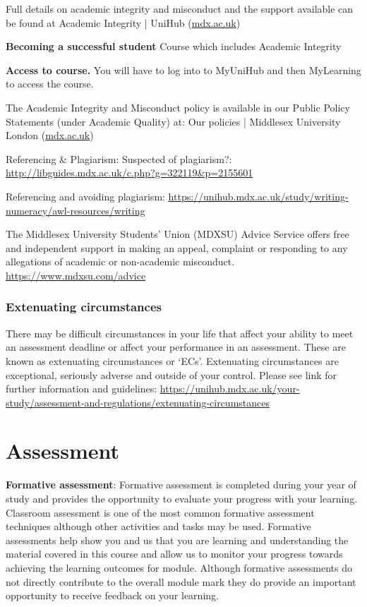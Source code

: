 \documentclass{MDXHandbook}
\begin{document}
Full details on academic integrity and misconduct and the support available can be found at  Academic Integrity | UniHub (\url{mdx.ac.uk}) 

\textbf{Becoming a successful student} Course which includes Academic Integrity

\textbf{Access to course.} You will have to log into to MyUniHub and then MyLearning to access the course.

The Academic Integrity and Misconduct policy is available in our Public Policy Statements (under Academic Quality) at: Our policies | Middlesex University London (\url{mdx.ac.uk})

Referencing \& Plagiarism: Suspected of plagiarism?:
\url{http://libguides.mdx.ac.uk/c.php?g=322119&p=2155601}

Referencing and avoiding plagiarism:
\url{https://unihub.mdx.ac.uk/study/writing-numeracy/awl-resources/writing}

The Middlesex University Students’ Union (MDXSU) Advice Service offers free and independent support  in making an appeal, complaint or responding to any allegations of academic or non-academic misconduct. 
\url{https://www.mdxsu.com/advice}

\subsubsection*{Extenuating circumstances}
There may be difficult circumstances in your life that affect your ability to meet an assessment deadline or affect your performance in an assessment. These are known as extenuating circumstances or ‘ECs’. Extenuating circumstances are exceptional, seriously adverse and outside of your control. Please see link for further information and guidelines:
\url{https://unihub.mdx.ac.uk/your-study/assessment-and-regulations/extenuating-circumstances}

\section{Assessment}
\textbf{Formative assessment}: Formative assessment is completed during your year of study and provides the opportunity to evaluate your progress with your learning.  Classroom assessment is one of the most common formative assessment techniques although other activities and tasks may be used. Formative assessments help show you and us that you are learning and understanding the material covered in this course and allow us to monitor your progress towards achieving the learning outcomes for module. Although formative assessments do not directly contribute to the overall module mark they do provide an important opportunity to receive feedback on your learning.
\end{document}
